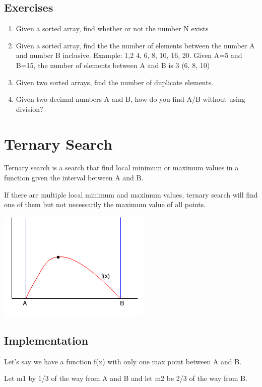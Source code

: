\documentclass[11pt,oneside]{book}
\makeatletter
\def\maxwidth#1{\ifdim\Gin@nat@width>#1 #1\else\Gin@nat@width\fi}
\makeatother
\begin{document}
\subsection{Exercises}

\begin{enumerate}
\item Given a sorted array, find whether or not the number N exists
\item Given a sorted array, find the the number of elements between the number A and number B inclusive.
Example: 1,2 4, 6, 8, 10, 16, 20. Given A=5 and B=15, the number of elements between A and B is 3 (6, 8, 10)
\item Given two sorted arrays, find the number of duplicate elements.
\item Given two decimal numbers A and B, how do you find A/B without using division?
\end{enumerate}

        \section{ Ternary Search }
        

Ternary search is a search that find local minimum or maximum values in a function given the interval between A and B.

If there are multiple local minimum and maximum values, ternary search will find one of them but not necessarily the maximum value of all points.

\vspace{5px}\includegraphics[width=\maxwidth{\textwidth}]{ternarysearch.png}

\subsection{Implementation}

Let's say we have a function f(x) with only one max point between A and B.

Let m1 by 1/3 of the way from A and B and let m2 be 2/3 of the way from B.
\end{document}
